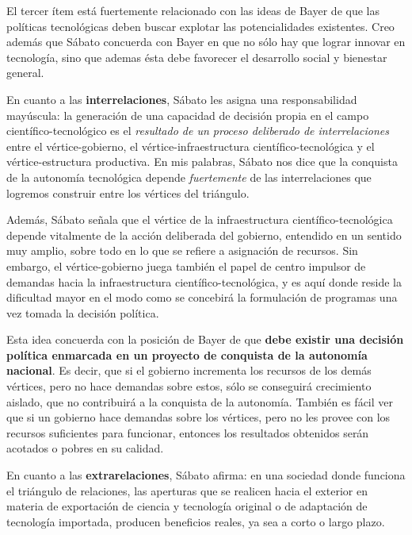 El tercer ítem está fuertemente relacionado con las ideas de Bayer de que las políticas tecnológicas deben buscar explotar las potencialidades existentes. Creo además que Sábato concuerda con Bayer en que no sólo hay que lograr innovar en tecnología, sino que ademas ésta debe favorecer el desarrollo social y bienestar general.

\vspace{0.5em}

En cuanto a las \textbf{interrelaciones}, Sábato les asigna una responsabilidad mayúscula: la generación de una capacidad de decisión propia en el campo científico-tecnológico es el \textit{resultado de un proceso deliberado de interrelaciones} entre el vértice-gobierno, el vértice-infraestructura científico-tecnológica y el vértice-estructura productiva.
En mis palabras, Sábato nos dice que la conquista de la autonomía tecnológica depende \textit{fuertemente} de las interrelaciones que logremos construir entre los vértices del triángulo.

Además, Sábato señala que el vértice de la infraestructura científico-tecnológica depende vitalmente de la acción deliberada del gobierno, entendido en un sentido muy amplio, sobre todo en lo que se refiere a asignación de recursos. Sin embargo, el vértice-gobierno juega también el papel de centro impulsor de demandas hacia la infraestructura científico-tecnológica, y es aquí donde reside la dificultad mayor en el modo como se concebirá la formulación de programas una vez tomada la decisión política.

Esta idea concuerda con la posición de Bayer de que \textbf{debe existir una decisión política enmarcada en un proyecto de conquista de la autonomía nacional}. Es decir, que si el gobierno incrementa los recursos de los demás vértices, pero no hace demandas sobre estos, sólo se conseguirá crecimiento aislado, que no contribuirá a la conquista de la autonomía. También es fácil ver que si un gobierno hace demandas sobre los vértices, pero no les provee con los recursos suficientes para funcionar, entonces los resultados obtenidos serán acotados o pobres en su calidad.

\vspace{0.5em}

En cuanto a las \textbf{extrarelaciones}, Sábato afirma: en una sociedad donde funciona el triángulo de relaciones, las aperturas que se realicen hacia el exterior en materia de exportación de ciencia y tecnología original o de adaptación de tecnología importada, producen beneficios reales, ya sea a corto o largo plazo.

